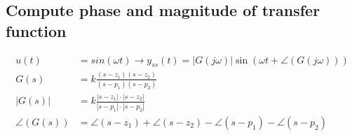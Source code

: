 \subsection{Compute phase and magnitude of transfer function}
\begin{align*}
    u(t) &= sin(\omega t) \rightarrow y_{ss}(t) = \left|G(j \omega)\right| \sin\left(\omega t + \angle(G(j \omega))\right)\\
    G(s) &= k \frac{(s-z_1)(s-z_2)}{(s-p_1)(s-p_2)}\\
    |G(s)| &= k \frac{|s-z_1| \cdot |s-z_2|}{|s-p_1| \cdot |s-p_2|}\\
    \angle(G(s)) &= \angle(s-z_1) + \angle(s-z_2) - \angle(s-p_1) - \angle(s-p_2)
\end{align*}